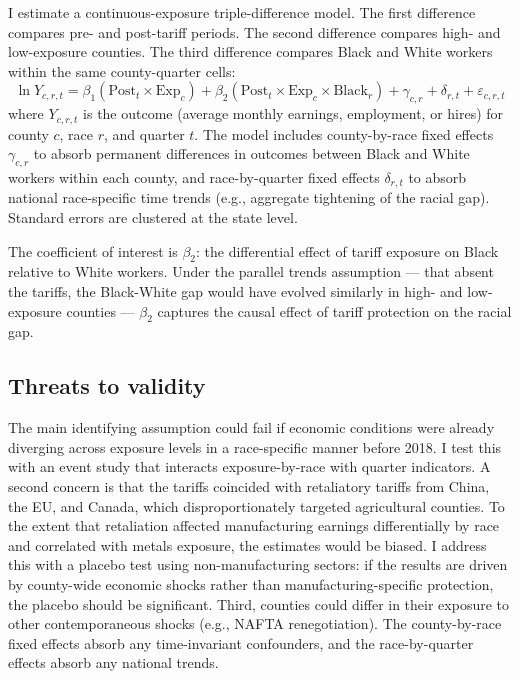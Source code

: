 \documentclass[12pt]{article}
\begin{document}
I estimate a continuous-exposure triple-difference model. The first difference compares pre- and post-tariff periods. The second difference compares high- and low-exposure counties. The third difference compares Black and White workers within the same county-quarter cells:
\begin{equation}
\label{eq:main}
\ln Y_{c,r,t} = \beta_1 (\text{Post}_t \times \text{Exp}_c) + \beta_2 (\text{Post}_t \times \text{Exp}_c \times \text{Black}_r) + \gamma_{c,r} + \delta_{r,t} + \varepsilon_{c,r,t}
\end{equation}
where $Y_{c,r,t}$ is the outcome (average monthly earnings, employment, or hires) for county $c$, race $r$, and quarter $t$. The model includes county-by-race fixed effects $\gamma_{c,r}$ to absorb permanent differences in outcomes between Black and White workers within each county, and race-by-quarter fixed effects $\delta_{r,t}$ to absorb national race-specific time trends (e.g., aggregate tightening of the racial gap). Standard errors are clustered at the state level.

The coefficient of interest is $\beta_2$: the differential effect of tariff exposure on Black relative to White workers. Under the parallel trends assumption --- that absent the tariffs, the Black-White gap would have evolved similarly in high- and low-exposure counties --- $\beta_2$ captures the causal effect of tariff protection on the racial gap.

\subsection{Threats to validity}

The main identifying assumption could fail if economic conditions were already diverging across exposure levels in a race-specific manner before 2018. I test this with an event study that interacts exposure-by-race with quarter indicators. A second concern is that the tariffs coincided with retaliatory tariffs from China, the EU, and Canada, which disproportionately targeted agricultural counties. To the extent that retaliation affected manufacturing earnings differentially by race and correlated with metals exposure, the estimates would be biased. I address this with a placebo test using non-manufacturing sectors: if the results are driven by county-wide economic shocks rather than manufacturing-specific protection, the placebo should be significant. Third, counties could differ in their exposure to other contemporaneous shocks (e.g., NAFTA renegotiation). The county-by-race fixed effects absorb any time-invariant confounders, and the race-by-quarter effects absorb any national trends.
\end{document}

